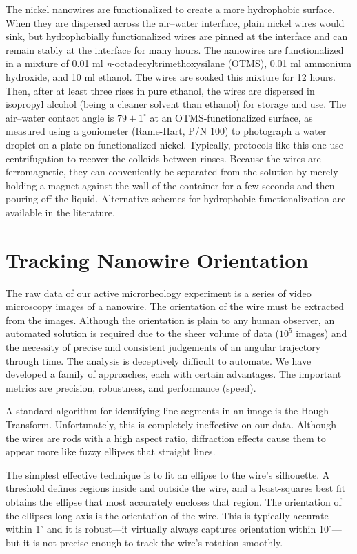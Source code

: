 The nickel nanowires are functionalized to create a more hydrophobic surface. When they are dispersed across the air--water interface, plain nickel wires would sink, but hydrophobially functionalized wires are pinned at the interface and can remain stably at the interface for many hours. The nanowires are functionalized in a mixture of 0.01 ml \emph{n}-octadecyltrimethoxysilane (OTMS), 0.01 ml ammonium hydroxide, and 10 ml ethanol. The wires are soaked this mixture for 12 hours. Then, after at least three rises in pure ethanol, the wires are dispersed in isopropyl alcohol (being a cleaner solvent than ethanol) for storage and use. The air--water contact angle is $79 \pm 1^\circ$ at an OTMS-functionalized surface, as measured using a goniometer (Rame-Hart, P/N 100)\cite{Lee2010} to photograph a water droplet on a plate on functionalized nickel. Typically, protocols like this one use centrifugation to recover the colloids between rinses. Because the wires are ferromagnetic, they can conveniently be separated from the solution by merely holding a magnet against the wall of the container for a few seconds and then pouring off the liquid. Alternative schemes for hydrophobic functionalization are available in the literature\cite{Sugimura2002,Fond2007}.

\section{Tracking Nanowire Orientation}

The raw data of our active microrheology experiment is a series of video microscopy images of a nanowire. The orientation of the wire must be extracted from the images. Although the orientation is plain to any human observer, an automated solution is required due to the sheer volume of data ($10^5$ images) and the necessity of precise and consistent judgements of an angular trajectory through time. The analysis is deceptively difficult to automate. We have developed a family of approaches, each with certain advantages. The important metrics are precision, robustness, and performance (speed).

A standard algorithm for identifying line segments in an image is the Hough Transform. Unfortunately, this is completely ineffective on our data. Although the wires are rods with a high aspect ratio, diffraction effects cause them to appear more like fuzzy ellipses that straight lines.

The simplest effective technique is to fit an ellipse to the wire's silhouette. A threshold defines regions inside and outside the wire, and a least-squares best fit obtains the ellipse that most accurately encloses that region. The orientation of the ellipses long axis is the orientation of the wire. This is typically accurate within 1$^\circ$ and it is robust---it virtually always captures orientation within 10$^\circ$---but it is not precise enough to track the wire's rotation smoothly.

